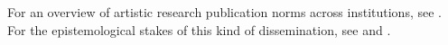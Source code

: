 For an overview of artistic research publication norms across
institutions, see \citet{sar2021guidelines}. For the epistemological
stakes of this kind of dissemination, see \citet{nelson2013practice}
and \citet{white2021choreography}.





\ARJprintdeclarations


